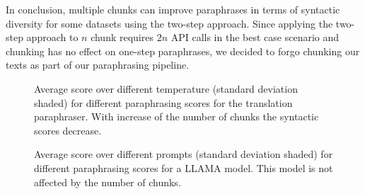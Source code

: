 In conclusion, multiple chunks can improve paraphrases in terms of syntactic diversity for some datasets using the two-step approach.
Since applying the two-step approach to $n$ chunk requires $2n$ API calls in the best case scenario and chunking has no effect on one-step paraphrases, we decided to forgo chunking our texts as part of our paraphrasing pipeline.

 
\begin{figure}[htbp]
    \centering
    
    \caption{Average score over different temperature (standard deviation shaded) for different paraphrasing scores for the translation paraphraser.
    With increase of the number of chunks the syntactic scores decrease.}
    \label{fig:abl_chunks_blog_translation}
\end{figure}



\begin{figure}[htbp]
    \centering
    
    \caption{Average score over different prompts (standard deviation shaded) for different paraphrasing scores for a LLAMA model. 
    This model is not affected by the number of chunks.}
    \label{fig:abl_chunks_student_essays_llama}
\end{figure}
